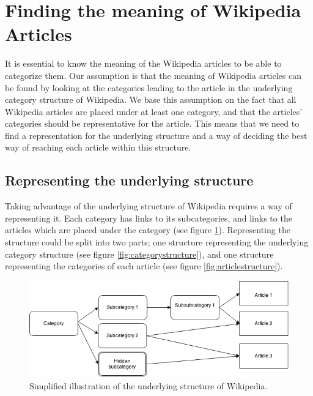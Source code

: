 
\section{Finding the meaning of Wikipedia Articles}
It is essential to know the meaning of the Wikipedia articles to be able to categorize them. 
Our assumption is that the meaning of Wikipedia articles can be found by looking at the categories leading to the article in the underlying category structure of Wikipedia. We base this assumption on the fact that all Wikipedia articles are placed under at least one category, and that the articles' categories should be representative for the article. This means that we need to find a representation for the underlying structure and a way of deciding the best way of reaching each article within this structure.


\subsection{Representing the underlying structure}
Taking advantage of the underlying structure of Wikipedia requires a way of representing it. Each category has links to its subcategories, and links to the articles which are placed under the category (see figure \ref{fig:graphstructure}). Representing the structure could be split into two parts; one structure representing the underlying category structure (see figure \ref{fig:categorystructure}), and one structure representing the categories of each article (see figure \ref{fig:articlestructure}).  %

\begin{figure}
\centering
\includegraphics[width=\textwidth]{Chapters/Methods/graphstructure}
\caption{Simplified illustration of the underlying structure of Wikipedia.}
\label{fig:graphstructure}
\end{figure}

